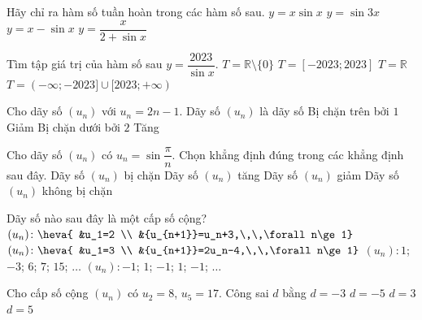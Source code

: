 \begin{ex}%
	Hãy chỉ ra hàm số tuần hoàn trong các hàm số sau.
	\choice
	{$y=x\sin x$}
	{\True $y=\sin 3x$}
	{$y=x-\sin x$}
	{$y=\dfrac{x}{2+\sin x}$}
\end{ex}
\begin{ex}%
	Tìm tập giá trị của hàm số sau $y=\dfrac{2023}{\sin x}$.
	\choice
	{$T=\mathbb{R}\setminus \{0\}$}
	{$T=[-2023;2023]$}
	{$T=\mathbb{R}$}
	{\True $T=(-\infty ;-2023]\cup [2023;+\infty)$}
	\loigiai{
		Ta có $-1\le \sin x\le 1\Rightarrow \dfrac{1}{\sin x}\le -1$ hoặc $\dfrac{1}{\sin x}\ge 1$.\\
		Suy ra $\dfrac{2023}{\sin x}\le -2023$ hoặc $\dfrac{2023}{\sin x}\ge 2023$.\\
		Vậy $T=(-\infty;-2023]\cup [2023;+\infty)$.}
\end{ex}
\begin{ex}%
	Cho dãy số $({u_n})$ với $u_n=2n-1$. Dãy số $(u_n)$ là dãy số
	\choice
	{Bị chặn trên bởi $1$}
	{Giảm}
	{Bị chặn dưới bởi $2$}
	{\True Tăng}
\end{ex}
\begin{ex}%
	Cho dãy số $(u_n)$ có $u_n=\sin \dfrac{\pi}{n}$. Chọn khẳng định đúng trong các khẳng định sau đây.
	\choice
	{\True Dãy số $(u_n)$ bị chặn}
	{Dãy số $(u_n)$ tăng}
	{Dãy số $(u_n)$ giảm}
	{Dãy số $(u_n)$ không bị chặn}
\end{ex}
\begin{ex}%
	Dãy số nào sau đây là một cấp số cộng?
	\choice
	{\True $(u_n)\colon \heva{ 
			&u_1=2 \\
			&{u_{n+1}}=u_n+3,\,\,\forall n\ge 1}$}
	{$(u_n)\colon \heva{ 
			&u_1=3 \\
			&{u_{n+1}}=2u_n-4,\,\,\forall n\ge 1}$}
	{$(u_n)\colon 1$; $-3$; $6$; $7$; $15$; $\ldots$}
	{$(u_n)\colon -1$; $1$; $-1$; $1$; $-1$; $\ldots$}
\end{ex}
\begin{ex}%
	Cho cấp số cộng $(u_n)$ có $u_2=8$, $u_5=17$. Công sai $d$ bằng
	\choice
	{$d=-3$}
	{$d=-5$}
	{\True $d=3$}
	{$d=5$}
\end{ex}
